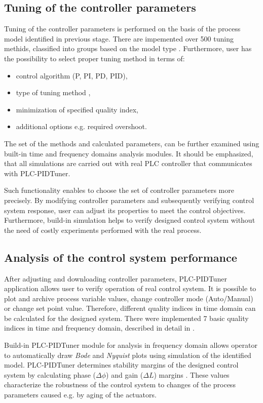 \documentclass{amcs}
\begin{document}
\subsection{Tuning of the controller parameters}
%
Tuning of the controller parameters is performed on the basis of the process model identified in previous stage. There are impemented over 500 tuning methids, classified into groups based on the model type \cite{Odwyer:2009}. Furthermore, user has the possibility to select proper tuning method in terms of:
%
\begin{itemize}
	\item control algorithm (P, PI, PD, PID),
	\item type of tuning method \cite{Odwyer:2009},
	\item minimization of specified quality index,
	\item additional options e.g. required overshoot.
\end{itemize}

The set of the methods and calculated parameters, can be further examined using  built-in time and frequency domains analysis modules. It should be emphasized, that all simulations are carried out with real PLC controller that communicates with PLC-PIDTuner.

Such functionality enables to choose the set of controller parameters more precisely. By modifying controller parameters and subsequently verifying control system response, user can adjust its properties to meet the control objectives. Furthermore, build-in simulation helps to verify designed control system without the need of costly experiments performed with the real process.
%
\subsection{Analysis of the control system performance}
%
After adjusting and downloading controller parameters, PLC-PIDTuner application allows user to verify operation of real control system. It is possible to plot and archive process variable values, change controller mode (Auto/Manual) or change set point value. Therefore, different quality indices in time domain can be calculated for the designed system. There were implemented 7 basic quality indices in time and frequency domain, described in detail in \cite{Kolaj:2015}.

Build-in PLC-PIDTuner module for analysis in frequency domain  allows operator to automatically draw \textit{Bode} and \textit{Nyquist} plots using simulation of the identified model. PLC-PIDTuner determines stability margins of the designed control system by calculating phase ($\Delta \phi$) and gain ($\Delta L$) margins \cite{Bishop:2010} \cite{Holejko:2010}. These values characterize the robustness of the control system to changes of the process parameters caused e.g. by aging of the actuators. 
\end{document}
